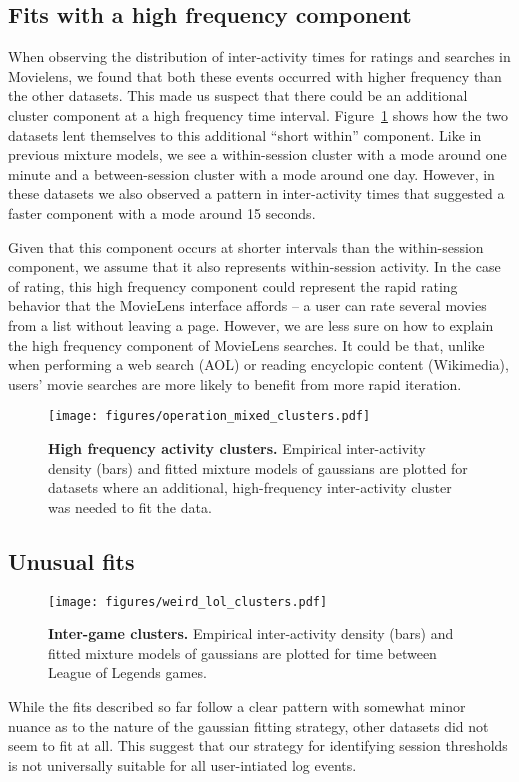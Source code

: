 \subsection{Fits with a high frequency component}
When observing the distribution of inter-activity times for ratings and searches in Movielens, we found that both these events occurred with higher frequency than the other datasets.  This made us suspect that there could be an additional cluster component at a high frequency time interval.  Figure~\ref{fig:operation_mixed_clusters} shows how the two datasets lent themselves to this additional ``short within'' component.  Like in previous mixture models, we see a within-session cluster with a mode around one minute and a between-session cluster with a mode around one day.  However, in these datasets we also observed a pattern in inter-activity times that suggested a faster component with a mode around 15 seconds.

Given that this component occurs at shorter intervals than the within-session component, we assume that it also represents within-session activity.  In the case of rating, this high frequency component could represent the rapid rating behavior that the MovieLens interface affords -- a user can rate several movies from a list without leaving a page.  However, we are less sure on how to explain the high frequency component of MovieLens searches.  It could be that, unlike when performing a web search (AOL) or reading encyclopic content (Wikimedia), users' movie searches are more likely to benefit from more rapid iteration.
\begin{figure}
\centering
\texttt{[image: figures/operation\_mixed\_clusters.pdf]}
\caption{
    \textbf{High frequency activity clusters.} Empirical inter-activity density (bars) and fitted mixture models of gaussians are plotted for datasets where an additional, high-frequency inter-activity cluster was needed to fit the data.
}
\label{fig:operation_mixed_clusters}
\end{figure}

\subsection{Unusual fits}
\begin{figure}
\centering
\texttt{[image: figures/weird\_lol\_clusters.pdf]}
\caption{
    \textbf{Inter-game clusters.} Empirical inter-activity density (bars) and fitted mixture models of gaussians are plotted for time between League of Legends games.
}
\label{fig:lol_game_clusters}
\end{figure}
While the fits described so far follow a clear pattern with somewhat minor nuance as to the nature of the gaussian fitting strategy, other datasets did not seem to fit at all.  This suggest that our strategy for identifying session thresholds is not universally suitable for all user-intiated log events.

